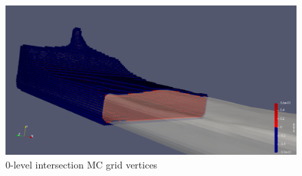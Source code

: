 \begin{figure}[H]
	\begin{center}
		\includegraphics[width=\textwidth]{figures/MlsIntersectionVertexSet.png}
	\end{center}
	\caption{0-level intersection MC grid vertices}
	\label{fig:intersection_vertices}
\end{figure}

